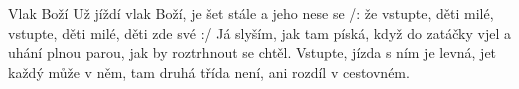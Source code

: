 \begin{TEXT}{Vlak Boží}
\SLOKA Už jíždí vlak Boží, \NL
je šet stále  \NL
a   jeho  \NL
nese  se 
\REFREN  /: že  vstupte, děti milé,  \NL
vstupte, děti milé,  \NL
děti  zde   své  :/
\SLOKA Já slyším, jak tam píská,\NL
když do zatáčky vjel\NL
a uhání plnou parou,\NL
jak by roztrhnout se chtěl.
\SLOKA Vstupte, jízda s ním je levná,\NL
jet každý může v něm,\NL
tam druhá třída není,\NL
ani rozdíl v cestovném.\NL
\end{TEXT}

